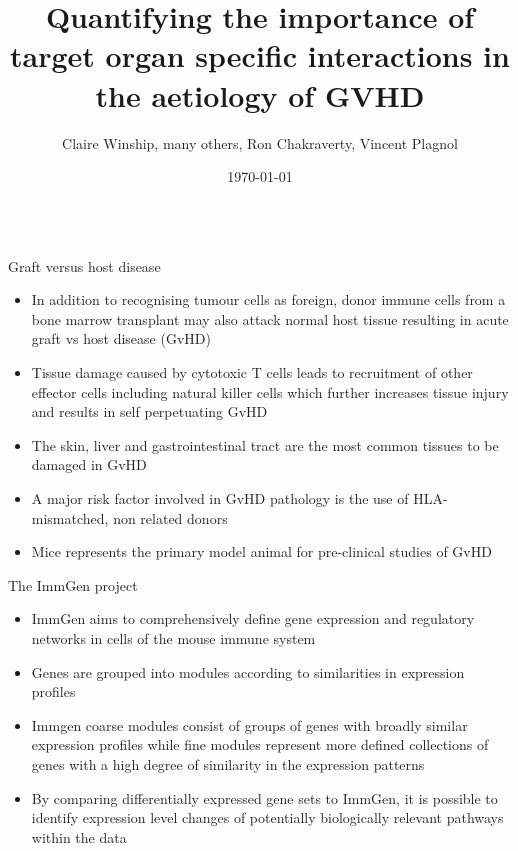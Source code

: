 \documentclass[final,hyperref={pdfpagelabels=false}]{beamer}
\title[GVHD]{Quantifying the importance of target organ specific interactions in the aetiology of GVHD}
\author[Winship \& Plagnol]{Claire Winship, many others, Ron Chakraverty, Vincent Plagnol}
\institute[UGI]{UCL Genetics Institute}
\date{\today}
\begin{document}
  \begin{frame}{} 

  \begin{beamercolorbox}{}
    \maketitle
  \end{beamercolorbox}


    \vfill
    \begin{columns}[t]

      \begin{column}{.20\linewidth}
        \begin{block}{Graft versus host disease}
    {\small  \begin{itemize}
          \item In addition to recognising tumour cells as foreign, donor immune cells from a bone marrow transplant may also attack normal host tissue resulting in acute graft vs host disease (GvHD)
	  \item Tissue damage caused by cytotoxic T cells leads to recruitment of other effector cells including natural killer cells which further increases tissue injury and results in self perpetuating GvHD
          \item The skin, liver and gastrointestinal tract are the most common tissues to be damaged in GvHD
	  \item A major risk factor involved in GvHD pathology is the use of HLA-mismatched, non related donors
          \item Mice represents the primary model animal for pre-clinical studies of GvHD
          \end{itemize}} 
        \end{block}

        \begin{block}{The ImmGen project}
     {\small     \begin{itemize}
          \item ImmGen aims to comprehensively define gene expression and regulatory networks in cells of the mouse immune system
          \item Genes are grouped into modules according to similarities in expression profiles 
          \item Immgen coarse modules consist of groups of genes with broadly similar expression profiles while fine modules represent more defined collections of genes with a high degree of similarity in the expression patterns
	  \item By comparing differentially expressed gene sets to ImmGen, it is possible to identify expression level changes of potentially biologically relevant pathways within the data
          \end{itemize}}
        \end{block}


\end{column}
\end{columns}
\end{frame}
\end{document}
